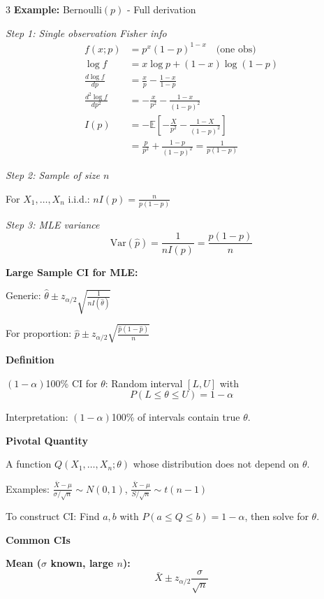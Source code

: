 \documentclass[10pt,letterpaper]{article}
\newcommand{\Var}{\text{Var}}
\newcommand{\E}{\mathbb{E}}
\begin{document}
\begin{multicols}{3}
\textbf{Example:} Bernoulli$(p)$ - Full derivation

\textit{Step 1: Single observation Fisher info}
\begin{align*}
f(x;p) &= p^x(1-p)^{1-x} \quad \text{(one obs)} \\
\log f &= x\log p + (1-x)\log(1-p) \\
\frac{d\log f}{dp} &= \frac{x}{p} - \frac{1-x}{1-p} \\
\frac{d^2\log f}{dp^2} &= -\frac{x}{p^2} - \frac{1-x}{(1-p)^2} \\
I(p) &= -\E\left[-\frac{X}{p^2} - \frac{1-X}{(1-p)^2}\right] \\
&= \frac{p}{p^2} + \frac{1-p}{(1-p)^2} = \frac{1}{p(1-p)}
\end{align*}

\textit{Step 2: Sample of size $n$}

For $X_1, \ldots, X_n$ i.i.d.: $nI(p) = \frac{n}{p(1-p)}$

\textit{Step 3: MLE variance}
$$\Var(\hat{p}) = \frac{1}{nI(p)} = \frac{p(1-p)}{n}$$

\textbf{Large Sample CI for MLE:}

Generic: $\hat{\theta} \pm z_{\alpha/2} \sqrt{\frac{1}{nI(\hat{\theta})}}$

For proportion: $\hat{p} \pm z_{\alpha/2}\sqrt{\frac{\hat{p}(1-\hat{p})}{n}}$

\vspace{2mm}
\vspace{0.5mm}

\textbf{Definition}

$(1-\alpha)$100\% CI for $\theta$: Random interval $[L, U]$ with
$$P(L \le \theta \le U) = 1 - \alpha$$

Interpretation: $(1-\alpha)$100\% of intervals contain true $\theta$.

\textbf{Pivotal Quantity}

A function $Q(X_1, \ldots, X_n; \theta)$ whose distribution does not depend on $\theta$.

Examples: $\frac{\bar{X}-\mu}{\sigma/\sqrt{n}} \sim N(0,1)$, $\frac{\bar{X}-\mu}{S/\sqrt{n}} \sim t(n-1)$

To construct CI: Find $a, b$ with $P(a \le Q \le b) = 1-\alpha$, then solve for $\theta$.

\textbf{Common CIs}

\textbf{Mean ($\sigma$ known, large $n$):}
$$\bar{X} \pm z_{\alpha/2} \frac{\sigma}{\sqrt{n}}$$


\end{multicols}
\end{document}
